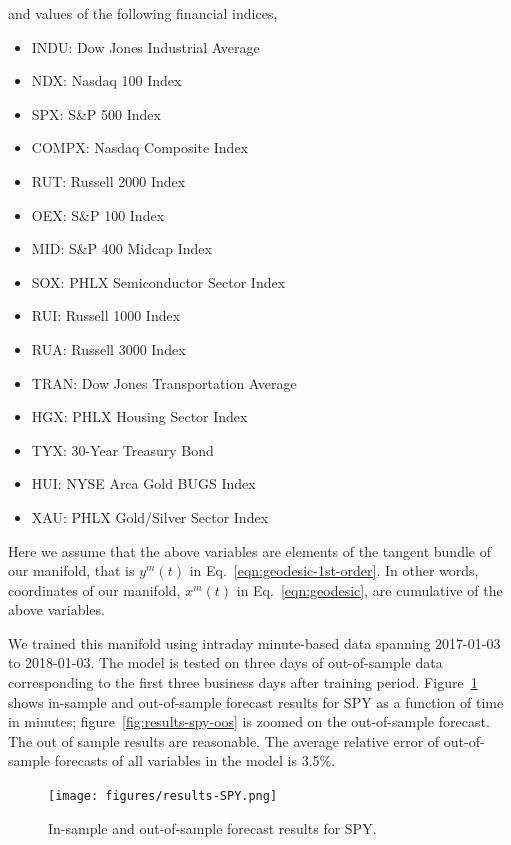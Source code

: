 \documentclass{article}
\begin{document}
and values of the following financial indices,

\begin{itemize}
    \item[] INDU:  Dow Jones Industrial Average 
    \item[] NDX:   Nasdaq 100 Index 
    \item[] SPX:   S\&P 500 Index 
    \item[] COMPX: Nasdaq Composite Index 
    \item[] RUT:   Russell 2000 Index 
    \item[] OEX:   S\&P 100 Index 
    \item[] MID:   S\&P 400 Midcap Index 
    \item[] SOX:   PHLX Semiconductor Sector Index 
    \item[] RUI:   Russell 1000 Index 
    \item[] RUA:   Russell 3000 Index 
    \item[] TRAN:  Dow Jones Transportation Average 
    \item[] HGX:   PHLX Housing Sector Index 
    \item[] TYX:   30-Year Treasury Bond 
    \item[] HUI:   NYSE Arca Gold BUGS Index 
    \item[] XAU:   PHLX Gold/Silver Sector Index
\end{itemize}

Here we assume that the above variables are elements of the tangent
bundle of our manifold, that is $y^{m}(t)$ in
Eq.~\ref{eqn:geodesic-1st-order}. In other words, coordinates of our
manifold, $x^{m}(t)$ in Eq.~\ref{eqn:geodesic}, are cumulative of the
above variables.

We trained this manifold using intraday minute-based data spanning
2017-01-03 to 2018-01-03. The model is tested on three days of
out-of-sample data corresponding to the first three business days
after training period. Figure~\ref{fig:results-spy} shows in-sample
and out-of-sample forecast results for SPY as a function of time in
minutes; figure~\ref{fig:results-spy-oos} is zoomed on the
out-of-sample forecast. The out of sample results are reasonable. The
average relative error of out-of-sample forecasts of all variables in
the model is 3.5\%.

\begin{figure}\label{fig:results-spy}
\texttt{[image: figures/results-SPY.png]}
\caption{In-sample and out-of-sample forecast results for SPY.}
\end{figure}
\end{document}

